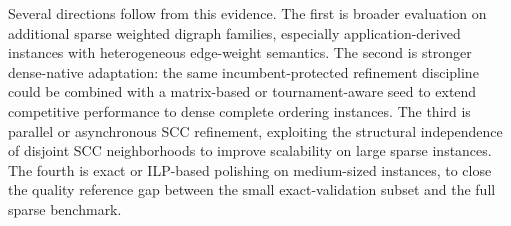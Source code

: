 Several directions follow from this evidence. The first is broader evaluation on additional sparse weighted digraph families, especially application-derived instances with heterogeneous edge-weight semantics. The second is stronger dense-native adaptation: the same incumbent-protected refinement discipline could be combined with a matrix-based or tournament-aware seed to extend competitive performance to dense complete ordering instances. The third is parallel or asynchronous SCC refinement, exploiting the structural independence of disjoint SCC neighborhoods to improve scalability on large sparse instances. The fourth is exact or ILP-based polishing on medium-sized instances, to close the quality reference gap between the small exact-validation subset and the full sparse benchmark.
